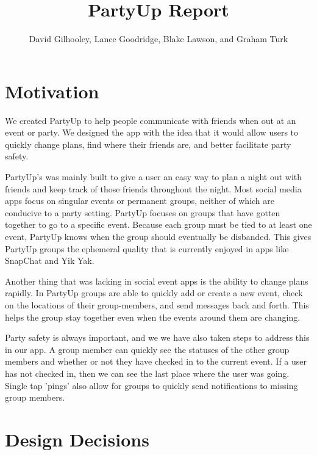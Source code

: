 \documentclass[12pt]{article}
\title{PartyUp Report}
\author{David Gilhooley, Lance Goodridge, Blake Lawson, and Graham Turk}
\begin{document}
\pagestyle{plain}

\maketitle

\section{Motivation} %
\label{sec:Motivation}
We created PartyUp to help people communicate with friends when out at an event or party. We designed the app with the idea that it would allow users to quickly change plans, find where their friends are, and better facilitate party safety.

\bigskip

PartyUp's was mainly built to give a user an easy way to plan a night out with friends and keep track of those friends throughout the night. Most social media apps focus on singular events or permanent groups, neither of which are conducive to a party setting.
PartyUp focuses on groups that have gotten together to go to a specific event. Because each group must be tied to at least one event, PartyUp knows when the group should eventually be disbanded. This gives PartyUp groups the ephemeral quality that is currently enjoyed in apps like SnapChat and Yik Yak.

\bigskip

Another thing that was lacking in social event apps is the ability to change plans rapidly. In PartyUp groups are able to quickly add or create a new event, check on the locations of their group-members, and send messages back and forth. This helps the group stay together even when the events around them are changing. 

\bigskip

Party safety is always important, and we we have also taken steps to address this in our app. A group member can quickly see the statuses of the other group members and whether or not they have checked in to the current event. If a user has not checked in, then we can see the last place where the user was going. Single tap 'pings' also allow for groups to quickly send notifications to missing group members.

\section{Design Decisions} %
\label{sec:design_decisions}
\end{document}
